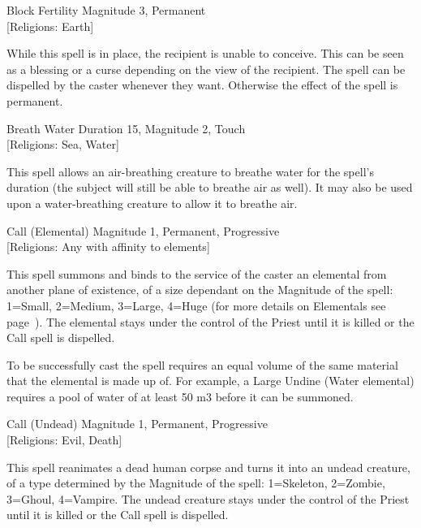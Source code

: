 \begin{rpg-spell}
{Block Fertility}
{Magnitude 3, Permanent\\{[Religions: Earth]}}

While this spell is in place, the recipient is unable to conceive. This can be seen as a blessing or a curse depending on the view of the recipient. The spell can be dispelled by the caster whenever they want. Otherwise the effect of the spell is permanent. 
\end{rpg-spell}

\begin{rpg-spell}
{Breath Water}
{Duration 15, Magnitude 2, Touch\\{[Religions: Sea, Water]}}

This spell allows an air-breathing creature to breathe water for the spell’s duration (the subject will still be able to breathe air as well). It may also be used upon a water-breathing creature to allow it to breathe air. 
\end{rpg-spell}

\begin{rpg-spell}
{Call (Elemental)}
{Magnitude 1, Permanent, Progressive\\{[Religions: Any with affinity to elements]}}

This spell summons and binds to the service of the caster an elemental from another plane of existence, of a size dependant on the Magnitude of the spell:
1=Small, 2=Medium, 3=Large, 4=Huge (for more details on Elementals see page~\pageref{monster:elemental}). The elemental stays under the control of the Priest until it is killed or the Call spell is dispelled. 
	
To be successfully cast the spell requires an equal volume of the same material that the elemental is made up of. For example, a Large Undine (Water elemental) requires a pool of water of at least 50 m3 before it can be summoned.
\end{rpg-spell}

\begin{rpg-spell}
{Call (Undead)}
{Magnitude 1, Permanent, Progressive\\{[Religions: Evil, Death]}}

This spell reanimates a dead human corpse and turns it into an undead creature, of a type determined by the Magnitude of the spell:
1=Skeleton, 2=Zombie, 3=Ghoul, 4=Vampire. The undead creature stays under the control of the Priest until it is killed or the Call spell is dispelled.
\end{rpg-spell}

